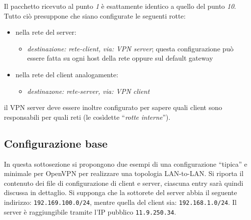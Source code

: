 Il pacchetto ricevuto al punto \textit{1} è esattamente identico a quello del
punto \textit{10}.
Tutto ciò presuppone che siano configurate le seguenti rotte:
\begin{itemize}
	\item nella rete del server:
	      \begin{itemize}
	      	\item \textit{destinazione: rete-client, via: VPN server}; questa configurazione
	      	      può essere fatta su ogni host della rete oppure sul default gateway
	      \end{itemize}
	\item nella rete del client analogamente:
	      \begin{itemize}
	      	\item \textit{destinazone: rete-server, via: VPN client}
	      \end{itemize}
\end{itemize}
il VPN server deve essere inoltre configurato per sapere quali client sono responsabili
per quali reti (le cosìdette ``\textit{rotte interne}'').


\subsection{Configurazione base}
In questa sottosezione si propongono due esempi di una configurazione ``tipica''
e minimale per OpenVPN per realizzare una topologia LAN-to-LAN. Si riporta il
contenuto dei file di configurazione di client e server, ciascuna entry sarà quindi discussa in dettaglio.
Si supponga che la sottorete del server abbia il seguente indirizzo: \texttt{192.169.100.0/24},
mentre quella del client sia: \texttt{192.168.1.0/24}. Il server è raggiungibile
tramite l'IP pubblico \texttt{11.9.250.34}.

